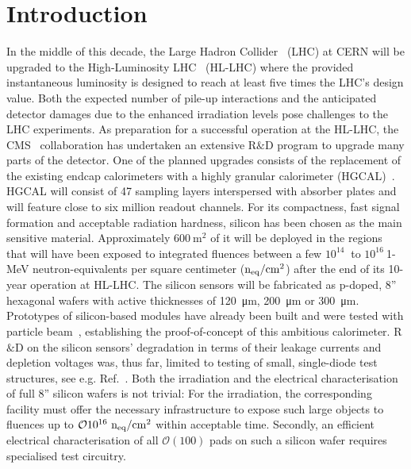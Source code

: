 \section{Introduction}
\label{sec:introduction}
In the middle of this decade, the Large Hadron Collider~\cite{evans:2008} (LHC) at CERN will be upgraded to the High-Luminosity LHC~\cite{hl-lhc-tdr:2017} (HL-LHC) where the provided instantaneous luminosity is designed to reach at least five times the LHC's design value.
Both the expected number of pile-up interactions and the anticipated detector damages due to the enhanced irradiation levels pose challenges to the LHC experiments.\newline
As preparation for a successful operation at the HL-LHC, the CMS~\cite{cms:2008} collaboration has undertaken an extensive R$\&$D program to upgrade many parts of the detector.
One of the planned upgrades consists of the replacement of the existing endcap calorimeters with a highly granular calorimeter (HGCAL)~\cite{hgcal-tdr:2018}.
HGCAL will consist of 47 sampling layers interspersed with absorber plates and will feature close to six million readout channels.
For its compactness, fast signal formation and acceptable radiation hardness, silicon has been chosen as the main sensitive material.
Approximately $\SI{600}{\metre\squared}$ of it will be deployed in the regions that will have been exposed to integrated fluences between a few $10^{14}~$ to $10^{16}~$1-MeV neutron-equivalents per square centimeter ($\mathrm{n_{eq}}/\mathrm{cm}^{2}$) after the end of its 10-year operation at HL-LHC. 
The silicon sensors will be fabricated as p-doped, 8'' hexagonal wafers with active thicknesses of \SI{120}{\micro\metre}, \SI{200}{\micro\metre} or \SI{300}{\micro\metre}.\newline
Prototypes of silicon-based modules have already been built and were tested with particle beam~\cite{cms_hgc-2016-beamtests,H1:2020,H2:2020}, establishing the proof-of-concept of this ambitious calorimeter.
R$\&$D on the silicon sensors' degradation in terms of their leakage currents and depletion voltages was, thus far, limited to testing of small, single-diode test structures, see e.g. Ref.~\cite{Curr_s_2017}.
Both the irradiation and the electrical characterisation of full 8'' silicon wafers is not trivial: 
For the irradiation, the corresponding facility must offer the necessary infrastructure to expose such large objects to fluences up to $\mathcal{O}{10^{16}}~\mathrm{n_{eq}}/\mathrm{cm}^{2}$ within acceptable time.
Secondly, an efficient electrical characterisation of all $\mathcal{O}(100)$ pads on such a silicon wafer requires specialised test circuitry.\newline
